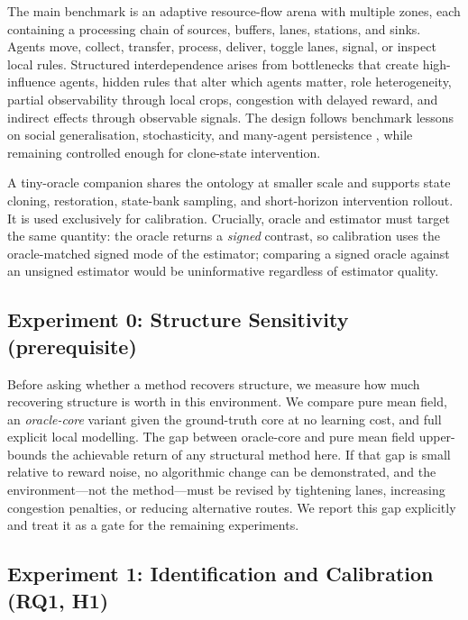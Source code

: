 \documentclass[conference]{IEEEtran}
\begin{document}
The main benchmark is an adaptive resource-flow arena with multiple zones, each containing a processing chain of sources, buffers, lanes, stations, and sinks. Agents move, collect, transfer, process, deliver, toggle lanes, signal, or inspect local rules. Structured interdependence arises from bottlenecks that create high-influence agents, hidden rules that alter which agents matter, role heterogeneity, partial observability through local crops, congestion with delayed reward, and indirect effects through observable signals. The design follows benchmark lessons on social generalisation, stochasticity, and many-agent persistence \cite{leibo2021meltingpot, ellis2023smacv2, suarez2019neuralmmo, carroll2019overcooked}, while remaining controlled enough for clone-state intervention.

A tiny-oracle companion shares the ontology at smaller scale and supports state cloning, restoration, state-bank sampling, and short-horizon intervention rollout. It is used exclusively for calibration. Crucially, oracle and estimator must target the same quantity: the oracle returns a \emph{signed} contrast, so calibration uses the oracle-matched signed mode of the estimator; comparing a signed oracle against an unsigned estimator would be uninformative regardless of estimator quality.

\subsection{Experiment 0: Structure Sensitivity (prerequisite)}

Before asking whether a method recovers structure, we measure how much recovering structure is worth in this environment. We compare pure mean field, an \emph{oracle-core} variant given the ground-truth core at no learning cost, and full explicit local modelling. The gap between oracle-core and pure mean field upper-bounds the achievable return of any structural method here. If that gap is small relative to reward noise, no algorithmic change can be demonstrated, and the environment---not the method---must be revised by tightening lanes, increasing congestion penalties, or reducing alternative routes. We report this gap explicitly and treat it as a gate for the remaining experiments.

\subsection{Experiment 1: Identification and Calibration (RQ1, H1)}
\end{document}
